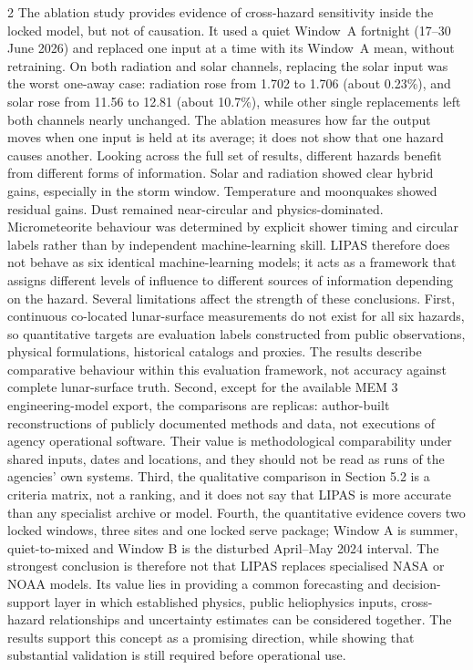 \begin{multicols}{2}
The ablation study provides evidence of cross-hazard sensitivity inside the locked model, but not of causation. It used a quiet Window~A fortnight (17--30 June 2026) and replaced one input at a time with its Window~A mean, without retraining. On both radiation and solar channels, replacing the solar input was the worst one-away case: radiation rose from 1.702 to 1.706 (about 0.23\%), and solar rose from 11.56 to 12.81 (about 10.7\%), while other single replacements left both channels nearly unchanged. The ablation measures how far the output moves when one input is held at its average; it does not show that one hazard causes another. Looking across the full set of results, different hazards benefit from different forms of information. Solar and radiation showed clear hybrid gains, especially in the storm window. Temperature and moonquakes showed residual gains. Dust remained near-circular and physics-dominated. Micrometeorite behaviour was determined by explicit shower timing and circular labels rather than by independent machine-learning skill. LIPAS therefore does not behave as six identical machine-learning models; it acts as a framework that assigns different levels of influence to different sources of information depending on the hazard. Several limitations affect the strength of these conclusions. First, continuous co-located lunar-surface measurements do not exist for all six hazards, so quantitative targets are evaluation labels constructed from public observations, physical formulations, historical catalogs and proxies. The results describe comparative behaviour within this evaluation framework, not accuracy against complete lunar-surface truth. Second, except for the available MEM 3 engineering-model export, the comparisons are replicas: author-built reconstructions of publicly documented methods and data, not executions of agency operational software. Their value is methodological comparability under shared inputs, dates and locations, and they should not be read as runs of the agencies' own systems. Third, the qualitative comparison in Section 5.2 is a criteria matrix, not a ranking, and it does not say that LIPAS is more accurate than any specialist archive or model. Fourth, the quantitative evidence covers two locked windows, three sites and one locked serve package; Window A is summer, quiet-to-mixed and Window B is the disturbed April--May 2024 interval. The strongest conclusion is therefore not that LIPAS replaces specialised NASA or NOAA models. Its value lies in providing a common forecasting and decision-support layer in which established physics, public heliophysics inputs, cross-hazard relationships and uncertainty estimates can be considered together. The results support this concept as a promising direction, while showing that substantial validation is still required before operational use.
\end{multicols}
